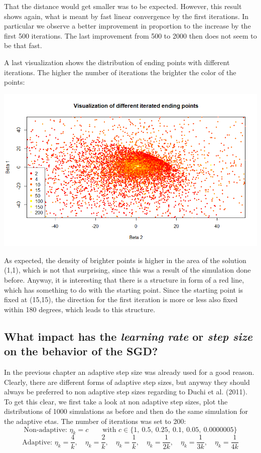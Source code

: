 \documentclass{article}
\begin{document}
That the distance would get smaller was to be expected. However, this result shows again, what is meant by fast linear convergence by the first iterations. In particular we observe a better improvement in proportion to the increase by the first 500 iterations. The last improvement from 500 to 2000 then does not seem to be that fast. 

\pagebreak
A last visualization shows the distribution of ending points with different iterations. The higher the number of iterations the brighter the color of the points:
\begin{center}
    \includegraphics[width=\textwidth]{Visulization Dots.png}
\end{center}
 As expected, the density of brighter points is higher in the area of the solution (1,1), which is not that surprising, since this was a result of the simulation done before. Anyway, it is interesting that there is a structure in form of a red line, which has something to do with the starting point. Since the starting point is fixed at (15,15), the direction for the first iteration is more or less also fixed within 180 degrees, which leads to this structure. 

\subsection{What impact has the \textit{learning rate} or \textit{step size} on the behavior of the SGD? }
In the previous chapter an adaptive step size was already used for a good reason. Clearly, there are different forms of adaptive step sizes, but anyway they should always be preferred to non adaptive step sizes regarding to Duchi et al. (2011). \cite{duchi2011adaptive} To get this clear, we first take a look at non adaptive step sizes, plot the distributions of 1000 simulations as before and then do the same simulation for the adaptive etas. The number of iterations was set to 200: $$\textrm{Non-adaptive: } \eta_k = c \quad \quad \textrm{with } c \in \{  1,\: 0.5,\: 0.25,\: 0.1,\: 0.05,\: 0.0000005 \} $$ 
$$\textrm{Adaptive: } \eta_k = \frac{4}{k} , \quad \eta_k = \frac{2}{k} ,\quad  \eta_k = \frac{1}{k} ,\quad  \eta_k = \frac{1}{2k} ,\quad  \eta_k = \frac{1}{3k} ,\quad  \eta_k = \frac{1}{4k} $$
\end{document}
